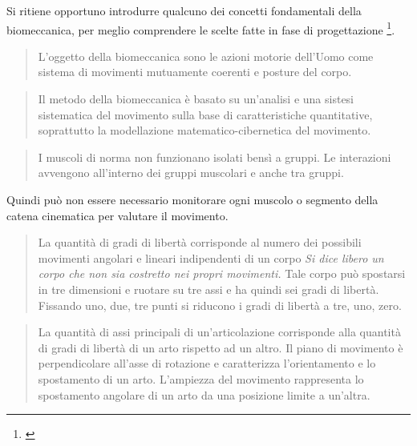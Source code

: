 Si ritiene opportuno introdurre qualcuno dei concetti fondamentali della biomeccanica,
per meglio comprendere le scelte fatte in fase di progettazione
\footnote{\cite{donskoi}}.

\begin{quote}
 {L'oggetto} della biomeccanica sono le azioni motorie dell'Uomo come sistema
di movimenti mutuamente coerenti e posture del corpo.
\end{quote}

\begin{quote}
 {Il metodo} della biomeccanica \`e basato su un'analisi e una sistesi sistematica
del movimento sulla base di caratteristiche quantitative,
soprattutto la modellazione matematico-cibernetica del movimento.
\end{quote}


\begin{quote}
I muscoli di norma non funzionano isolati bens\`i a gruppi.
Le interazioni avvengono all'interno dei gruppi muscolari e anche tra gruppi.
\end{quote}
Quindi può non essere necessario monitorare ogni muscolo
o segmento della catena cinematica per valutare il movimento.

\begin{quote}
La quantit\`a di gradi di libert\`a corrisponde al numero dei possibili movimenti
angolari e lineari indipendenti di un corpo
\textit {Si dice \emph {libero} un corpo che non sia costretto nei propri movimenti.}
Tale corpo pu\`o spostarsi in tre dimensioni e ruotare su tre assi
e ha quindi sei gradi di libert\`a.
Fissando uno, due, tre punti si riducono i gradi di libert\`a a tre, uno, zero.
\end{quote}


\begin{quote}
La quantit\`a di assi principali di un'articolazione corrisponde
alla quantit\`a di gradi di libert\`a di un arto rispetto ad un altro.
Il piano di movimento \`e perpendicolare all'asse di rotazione
e caratterizza l'orientamento e lo spostamento di un arto.
L'ampiezza del movimento rappresenta lo spostamento angolare
di un arto da una posizione limite a un'altra.
\end{quote}